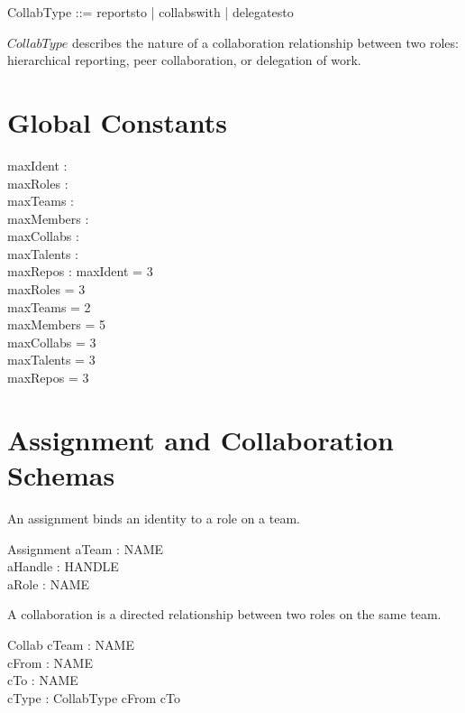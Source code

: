 \documentclass[a4paper,10pt,fleqn]{article}
\begin{document}
\begin{zed}
  CollabType ::= reportsto | collabswith | delegatesto
\end{zed}

$CollabType$ describes the nature of a collaboration relationship
between two roles: hierarchical reporting, peer collaboration, or
delegation of work.

\section{Global Constants}

\begin{axdef}
  maxIdent : \nat \\
  maxRoles : \nat \\
  maxTeams : \nat \\
  maxMembers : \nat \\
  maxCollabs : \nat \\
  maxTalents : \nat \\
  maxRepos : \nat
\where
  maxIdent = 3 \\
  maxRoles = 3 \\
  maxTeams = 2 \\
  maxMembers = 5 \\
  maxCollabs = 3 \\
  maxTalents = 3 \\
  maxRepos = 3
\end{axdef}

\section{Assignment and Collaboration Schemas}

An assignment binds an identity to a role on a team.

\begin{schema}{Assignment}
  aTeam : NAME \\
  aHandle : HANDLE \\
  aRole : NAME
\end{schema}

A collaboration is a directed relationship between two roles on
the same team.

\begin{schema}{Collab}
  cTeam : NAME \\
  cFrom : NAME \\
  cTo : NAME \\
  cType : CollabType
\where
  cFrom \neq cTo
\end{schema}
\end{document}

